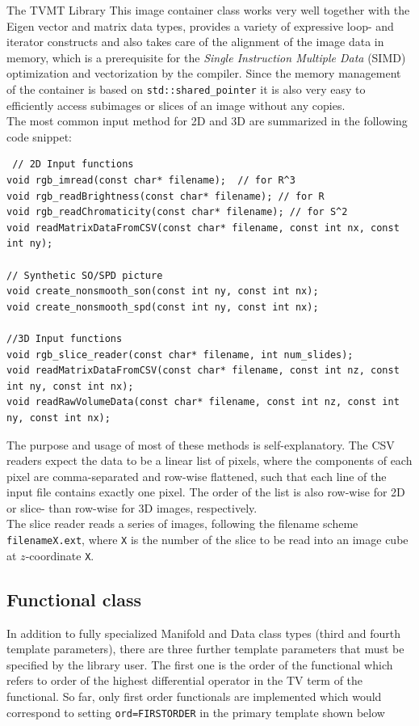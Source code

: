 \begin{chapter}{The TVMT Library}
This image container class works very well together with the Eigen vector and matrix data types, provides a variety of expressive loop- and iterator constructs and also takes care
of the alignment of the image data in memory, which is a prerequisite for the \textit{Single Instruction Multiple Data} (SIMD) optimization and vectorization by the compiler.
Since the memory management of the container is based on \texttt{std::shared\_pointer} it is also very easy to efficiently access subimages or slices of an image without any copies.\\

The most common input method for 2D and 3D are summarized in the following code snippet:
\cppinline
\begin{lstlisting}
 // 2D Input functions
void rgb_imread(const char* filename);	// for R^3
void rgb_readBrightness(const char* filename); // for R
void rgb_readChromaticity(const char* filename); // for S^2
void readMatrixDataFromCSV(const char* filename, const int nx, const int ny);

// Synthetic SO/SPD picture 
void create_nonsmooth_son(const int ny, const int nx);
void create_nonsmooth_spd(const int ny, const int nx);
 
//3D Input functions
void rgb_slice_reader(const char* filename, int num_slides); 
void readMatrixDataFromCSV(const char* filename, const int nz, const int ny, const int nx);
void readRawVolumeData(const char* filename, const int nz, const int ny, const int nx);
\end{lstlisting}
The purpose and usage of most of these methods is self-explanatory. The CSV readers expect the data to be a linear list of pixels, where the components of each pixel are
comma-separated and row-wise flattened, such that each line of the input file contains exactly one pixel. The order of the list is also row-wise for 2D or slice- than row-wise for 3D images,
respectively. \\ 
The slice reader reads a series of images, following the filename scheme \texttt{filenameX.ext}, where \texttt{X} is the number of the slice to be read into an image cube at $z$-coordinate
\texttt{X}.

\subsection{Functional class} %
\label{sub:Functional class}
In addition to fully specialized Manifold and Data class types (third and fourth template parameters),
there are three further template parameters that must be specified by the library user. The first one
is the order of the functional which refers to order of the highest differential operator in the TV term of the functional.
So far, only first order functionals are implemented which would correspond to setting \texttt{ord=FIRSTORDER} in the primary template shown below


\end{chapter}
